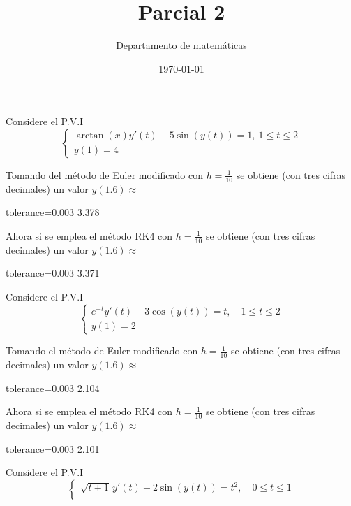 \documentclass{article}
\title{Parcial 2}
\author{Departamento de matemáticas}
\date{\today}
\begin{document}
	\maketitle
	\begin{quiz}{}
    	\begin{cloze}{}
    	Considere el P.V.I
    	\[\begin{cases}\arctan(x)y'(t)-5\sin(y(t)) = 1, \ 1\leq t \leq 2 \\
    	y(1) = 4\end{cases}\]
        \begin{numerical}[points=15]{}
        	Tomando del m\'etodo de Euler modificado con $h=\frac{1}{10}$ se obtiene (con tres cifras decimales) un valor $y(1.6)\approx$\item[tolerance=0.003] 3.378
        \end{numerical}
        \begin{numerical}[points=18]{}
        	Ahora si se emplea el m\'etodo RK4 con $h=\frac{1}{10}$ se obtiene (con tres cifras decimales) un valor $y(1.6)\approx$\item[tolerance=0.003] 3.371
        \end{numerical}
        \end{cloze}
        \begin{cloze}{}
        	Considere el P.V.I
        	\[
        	\begin{cases}
        		e^{-t} y'(t) - 3\cos(y(t)) = t, \quad 1 \leq t \leq 2 \\
        		y(1) = 2
        	\end{cases}
        	\]
        	\begin{numerical}[points=15]{}
        		Tomando el m\'etodo de Euler modificado con $h=\frac{1}{10}$ se obtiene (con tres cifras decimales) un valor $y(1.6)\approx$ \item[tolerance=0.003] 2.104
        	\end{numerical}
        	\begin{numerical}[points=18]{}
        		Ahora si se emplea el m\'etodo RK4 con $h=\frac{1}{10}$ se obtiene (con tres cifras decimales) un valor $y(1.6)\approx$ \item[tolerance=0.003] 2.101
        	\end{numerical}
        \end{cloze}
    \begin{cloze}{}
    	Considere el P.V.I
    	\[
    	\begin{cases}
    		\sqrt{t+1} \, y'(t) - 2\sin(y(t)) = t^2, \quad 0 \leq t \leq 1 \\

\end{cases}\]
\end{cloze}
\end{quiz}
\end{document}
